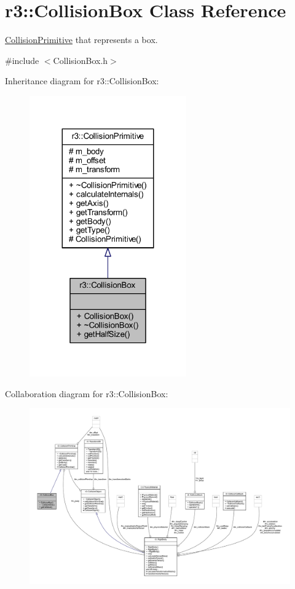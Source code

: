 \hypertarget{classr3_1_1_collision_box}{}\section{r3\+:\+:Collision\+Box Class Reference}
\label{classr3_1_1_collision_box}


\mbox{\hyperlink{classr3_1_1_collision_primitive}{Collision\+Primitive}} that represents a box.  




{\ttfamily \#include $<$Collision\+Box.\+h$>$}



Inheritance diagram for r3\+:\+:Collision\+Box\+:\nopagebreak
\begin{figure}[H]
\begin{center}
\leavevmode
\includegraphics[width=191pt]{classr3_1_1_collision_box__inherit__graph}
\end{center}
\end{figure}


Collaboration diagram for r3\+:\+:Collision\+Box\+:\nopagebreak
\begin{figure}[H]
\begin{center}
\leavevmode
\includegraphics[width=350pt]{classr3_1_1_collision_box__coll__graph}
\end{center}
\end{figure}

